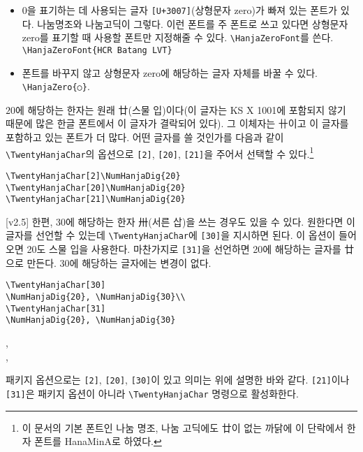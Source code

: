 \documentclass[b5paper,nanum]{oblivoir}
\def\cs#1{\texttt{\textbackslash #1}}
\def\ct#1{\texttt{#1}}
\begin{document}
\begin{itemize}\firmlist
\item $0$을 표기하는 데 사용되는 글자 \ct{[U+3007]}(상형문자 zero)가 빠져 있는 폰트가 있다.
나눔명조와 나눔고딕이 그렇다. 이런 폰트를 주 폰트로 쓰고 있다면 상형문자 zero를 표기할 때 사용할 폰트만 지정해줄 수 있다. \cs{HanjaZeroFont}를 쓴다.
\verb|\HanjaZeroFont{HCR Batang LVT}|
\item 폰트를 바꾸지 않고 상형문자 zero에 해당하는 글자 자체를 바꿀 수 있다. \verb|\HanjaZero{○}|.
\end{itemize}

$20$에 해당하는 한자는 원래 廿(스물 입)이다(이 글자는 KS X 1001에 포함되지 않기 때문에 많은 한글 폰트에서 이 글자가 결락되어 있다). 그 이체자는 卄이고 이 글자를 포함하고 있는 폰트가 더 많다. 어떤 글자를 쓸 것인가를 다음과 같이 \cs{TwentyHanjaChar}의 옵션으로 \ct{[2]}, \ct{[20]}, \ct{[21]}을 주어서 선택할 수 있다.\footnote{%
	이 문서의 기본 폰트인 나눔 명조, 나눔 고딕에도 廿이 없는 까닭에 이 단락에서 한자 폰트를 HanaMinA로 하였다.}

\begin{verbatim}
\TwentyHanjaChar[2]\NumHanjaDig{20}
\TwentyHanjaChar[20]\NumHanjaDig{20}
\TwentyHanjaChar[21]\NumHanjaDig{20}
\end{verbatim}
\TwentyHanjaChar[2]
\TwentyHanjaChar[20]
\TwentyHanjaChar[21]

\medskip

[v2.5] 한편, 30에 해당하는 한자 卅(서른 삽)을 쓰는 경우도 있을 수 있다. 원한다면 이 글자를 선언할 수 있는데 \cs{TwentyHanjaChar}에 \ct{[30]}을 지시하면 된다. 이 옵션이 들어오면 20도 스물 입을 사용한다.
마찬가지로 \ct{[31]}을 선언하면 20에 해당하는 글자를 廿으로 만든다. 30에 해당하는 글자에는 변경이 없다.
\begin{verbatim}
\TwentyHanjaChar[30]
\NumHanjaDig{20}, \NumHanjaDig{30}\\
\TwentyHanjaChar[31]
\NumHanjaDig{20}, \NumHanjaDig{30}
\end{verbatim}
\TwentyHanjaChar[30]
, \\
\TwentyHanjaChar[31]
, 

\medskip

패키지 옵션으로는 \ct{[2]}, \ct{[20]}, \ct{[30]}이 있고 의미는 위에 설명한 바와 같다. \ct{[21]}이나
\ct{[31]}은 패키지 옵션이 아니라 \cs{TwentyHanjaChar} 명령으로 활성화한다.
\end{document}
